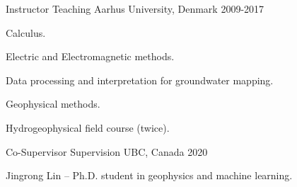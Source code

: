 

\begin{cventries}

  \cventry
    {Instructor} %
    {Teaching} %
    {Aarhus University, Denmark} %
    {2009-2017} %
    {
      \begin{cvitems} %
        \item {Calculus.}
        \item {Electric and Electromagnetic methods.}
        \item {Data processing and interpretation for groundwater mapping.}
        \item {Geophysical methods.}
        \item {Hydrogeophysical field course (twice).}
      \end{cvitems}
    }

  \cventry
    {Co-Supervisor} %
    {Supervision} %
    {UBC, Canada} %
    {2020} %
    {
      \begin{cvitems} %
        \item {Jingrong Lin -- Ph.D. student in geophysics and machine learning.}
      \end{cvitems}
    }


\end{cventries}
